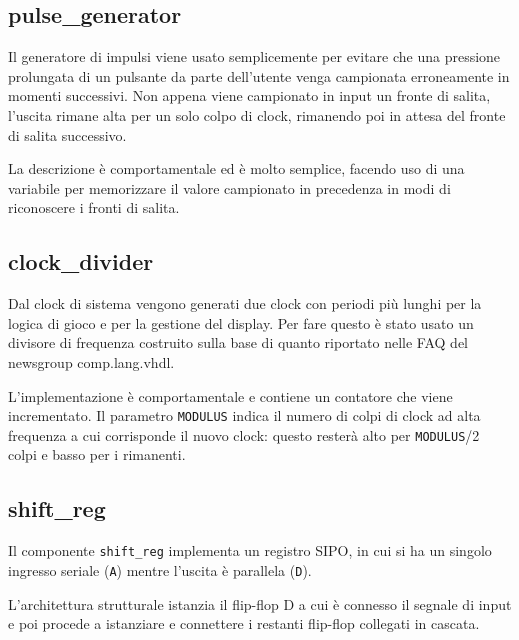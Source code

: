 \documentclass [11pt,a4paper,oneside]{article}
\newcommand{\component}[1]{\texttt{#1}}
\newcommand{\identifier}[1]{\texttt{#1}}
\begin{document}
\subsection{pulse\_generator}

Il generatore di impulsi viene usato semplicemente per evitare che una
pressione prolungata di un pulsante da parte dell'utente venga
campionata erroneamente in momenti successivi. Non appena viene
campionato in input un fronte di salita, l'uscita rimane alta per un solo
colpo di clock, rimanendo poi in attesa del fronte di salita successivo.



La descrizione è comportamentale ed è molto semplice, facendo uso di
una variabile per memorizzare il valore campionato in precedenza in
modi di riconoscere i fronti di salita.



\subsection{clock\_divider}

Dal clock di sistema vengono generati due clock con periodi più
lunghi per la logica di gioco e per la gestione del display.
Per fare questo è stato usato un divisore di frequenza costruito
sulla base di quanto riportato nelle FAQ del newsgroup
comp.lang.vhdl.



L'implementazione è comportamentale e contiene un contatore che viene
incrementato. Il parametro \identifier{MODULUS} indica il numero di colpi di
clock ad alta frequenza a cui corrisponde il nuovo clock: questo
resterà alto per \identifier{MODULUS}/2 colpi e basso per i rimanenti.



\subsection{shift\_reg}

Il componente \component{shift\_reg} implementa un registro SIPO, in cui
si ha un singolo ingresso seriale (\identifier{A}) mentre l'uscita è
parallela (\identifier{D}).



L'architettura strutturale istanzia il flip-flop D a cui è connesso
il segnale di input e poi procede a istanziare e connettere i restanti
flip-flop collegati in cascata.
\end{document}

